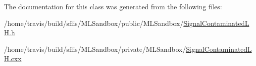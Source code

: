The documentation for this class was generated from the following files\-:\begin{DoxyCompactItemize}
\item 
/home/travis/build/sflis/\-M\-L\-Sandbox/public/\-M\-L\-Sandbox/\hyperlink{SignalContaminatedLH_8h}{Signal\-Contaminated\-L\-H.\-h}\item 
/home/travis/build/sflis/\-M\-L\-Sandbox/private/\-M\-L\-Sandbox/\hyperlink{SignalContaminatedLH_8cxx}{Signal\-Contaminated\-L\-H.\-cxx}\end{DoxyCompactItemize}
